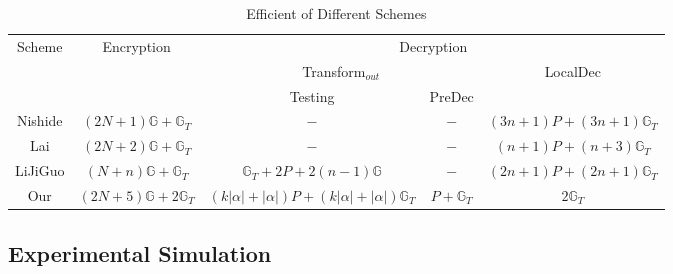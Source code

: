 \documentclass[smallextended]{svjour3}       %
\begin{document}
\begin{table}
	\centering
	\caption{Efficient of Different Schemes}
	\resizebox{\textwidth}{10mm}
	{
		\begin{tabular}{|c|c|c|c|c|}
			\hline  
			\multirow{3}{*}{Scheme} & \multirow{3}{*}{Encryption} & \multicolumn{3}{c|}{Decryption} \\			
		\cline{3-5}          &       & \multicolumn{2}{c|}{Transform$_{out}$} & \multirow{2}{*}{LocalDec} \\
		\cline{3-4}          &       & Testing & PreDec &  \\
		\hline
		Nishide     &$(2N+1)\mathbb{G}+\mathbb{G}_T$     & $-$     & $-$     & $(3n+1)P+(3n+1)\mathbb{G}_T$ \\
		\hline
		Lai     & $(2N+2)\mathbb{G}+\mathbb{G}_T$     & $-$     & $-$     & $(n+1)P+(n+3)\mathbb{G}_T$ \\
		\hline
		LiJiGuo      & $(N+n)\mathbb{G}+\mathbb{G}_T$ &  $\mathbb{G}_T+2P+2(n-1)\mathbb{G}$  & $-$ & $(2n+1)P+(2n+1)\mathbb{G}_T$ \\
		\hline
		Our     & $(2N+5)\mathbb{G}+2\mathbb{G}_T$    & $(k|\alpha|+|\alpha|)P+(k|\alpha|+|\alpha|)\mathbb{G}_T$     & $P+\mathbb{G}_T$     & $2\mathbb{G}_T$ \\
		\hline
		\end{tabular}
	}
	\label{efficiencyTable}
  \end{table}


	  

  

  
  



\subsection{Experimental Simulation}
\end{document}
